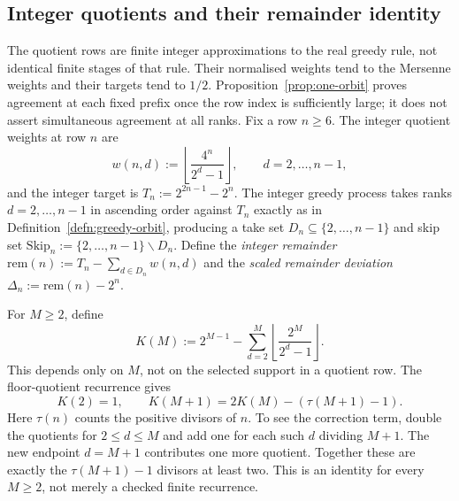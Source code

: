 \subsection{Integer quotients and their remainder identity}
\label{ssec:seam-model}

The quotient rows are finite integer approximations to the real
greedy rule, not identical finite stages of that rule.  Their
normalised weights tend to the Mersenne weights and their targets
tend to $1/2$.  Proposition~\ref{prop:one-orbit} proves agreement
at each fixed prefix once the row index is sufficiently large;
it does not assert simultaneous agreement at all ranks.
Fix a row $n\ge6$. The integer quotient weights at row $n$ are
\[
w(n,d) := \left\lfloor \frac{4^n}{2^d-1} \right\rfloor, \qquad d = 2,\dots,n-1,
\]
and the integer target is $T_n := 2^{2n-1} - 2^n$. The integer greedy process takes ranks $d = 2,\dots,n-1$
in ascending order against $T_n$ exactly as in Definition~\ref{defn:greedy-orbit}, producing a take
set $D_n \subseteq \{2,\dots,n-1\}$ and skip set
$\mathrm{Skip}_n := \{2,\dots,n-1\} \mathbin{\backslash} D_n$.
Define the \emph{integer remainder} $\mathrm{rem}(n) := T_n - \sum_{d \in D_n} w(n,d)$ and the
\emph{scaled remainder deviation} $\Delta_n := \mathrm{rem}(n) - 2^n$.

\begin{defn}
For $M \ge 2$, define
\[
K(M) := 2^{M-1} - \sum_{d=2}^{M} \left\lfloor \frac{2^M}{2^d-1} \right\rfloor.
\]
This depends only on $M$, not on the selected support in a quotient
row.  The floor-quotient recurrence gives
\[
 K(2)=1,\qquad K(M+1)=2K(M)-(\tau(M+1)-1).
\]
Here $\tau(n)$ counts the positive divisors of $n$.  To see the correction term, double the quotients for $2\le d\le M$
and add one for each such $d$ dividing $M+1$.  The new endpoint
$d=M+1$ contributes one more quotient.  Together these are
exactly the $\tau(M+1)-1$ divisors at least two.
This is an identity for every $M\ge2$, not merely a checked
finite recurrence.
\end{defn}

